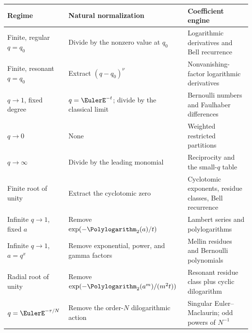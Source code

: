 \documentclass[11pt,oneside]{article}
\theoremstyle{definition}
\theoremstyle{remark}
\providecommand{\backmatter}{}
\begin{document}
\begin{longtable}{@{}>{\raggedright\arraybackslash}p{}
                  >{\raggedright\arraybackslash}p{}
                  >{\raggedright\arraybackslash}p{}@{}}
\toprule
Regime & Natural normalization & Coefficient engine\\
\midrule
\endhead
Finite, regular $q=q_0$
 & Divide by the nonzero value at $q_0$
 & Logarithmic derivatives and Bell recurrence\\
Finite, resonant $q=q_0$
 & Extract $(q-q_0)^\nu$
 & Nonvanishing-factor logarithmic derivatives\\
$q\to1$, fixed degree
 & $q=\EulerE^{-t}$; divide by the classical limit
 & Bernoulli numbers and Faulhaber differences\\
$q\to0$
 & None
 & Weighted restricted partitions\\
$q\to\infty$
 & Divide by the leading monomial
 & Reciprocity and the small-$q$ table\\
Finite root of unity
 & Extract the cyclotomic zero
 & Cyclotomic exponents, residue classes, Bell recurrence\\
Infinite $q\to1$, fixed $a$
 & Remove $\exp(-\Polylogarithm_2(a)/t)$
 & Lambert series and polylogarithms\\
Infinite $q\to1$, $a=q^x$
 & Remove exponential, power, and gamma factors
 & Mellin residues and Bernoulli polynomials\\
Radial root of unity
 & Remove $\exp(-\Polylogarithm_2(a^m)/(m^2t))$
 & Resonant residue class plus cyclic dilogarithm\\
$q=\EulerE^{-\tau/N}$
 & Remove the order-$N$ dilogarithmic action
 & Singular Euler--Maclaurin; odd powers of $N^{-1}$\\
\bottomrule
\end{longtable}

\backmatter
\end{document}
